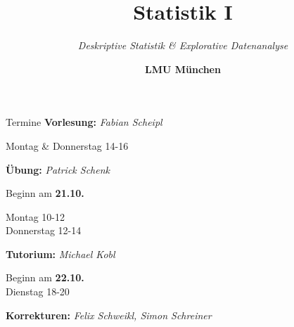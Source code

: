 \documentclass[
  10pt,
  ignorenonframetext,
]{beamer}
\title{Statistik I}
\subtitle{\emph{Deskriptive Statistik \& Explorative Datenanalyse}}
\author{\textbf{LMU München}}
\date{}
\begin{document}
\frame{\titlepage}

\begin{frame}
\end{frame}

\begin{frame}{Termine}
\label{termine}
\textbf{Vorlesung:} \emph{Fabian Scheipl}

Montag \& Donnerstag 14-16 ~

\textbf{Übung:} \emph{Patrick Schenk}

Beginn am \textbf{21.10.}

Montag 10-12\\
Donnerstag 12-14 ~

\textbf{Tutorium:} \emph{Michael Kobl}

Beginn am \textbf{22.10.}\\
Dienstag 18-20

\textbf{Korrekturen:} \emph{Felix Schweikl, Simon Schreiner}
\end{frame}
\end{document}
